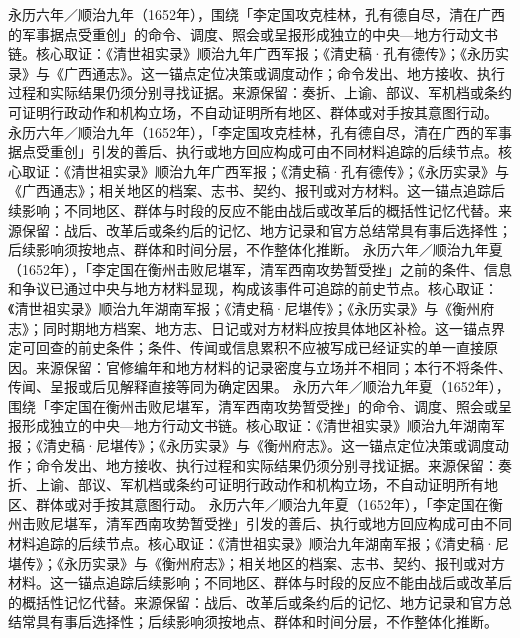 永历六年／顺治九年（1652年），围绕「李定国攻克桂林，孔有德自尽，清在广西的军事据点受重创」的命令、调度、照会或呈报形成独立的中央—地方行动文书链。核心取证：《清世祖实录》顺治九年广西军报；《清史稿·孔有德传》；《永历实录》与《广西通志》。这一锚点定位决策或调度动作；命令发出、地方接收、执行过程和实际结果仍须分别寻找证据。来源保留：奏折、上谕、部议、军机档或条约可证明行政动作和机构立场，不自动证明所有地区、群体或对手按其意图行动。
永历六年／顺治九年（1652年），「李定国攻克桂林，孔有德自尽，清在广西的军事据点受重创」引发的善后、执行或地方回应构成可由不同材料追踪的后续节点。核心取证：《清世祖实录》顺治九年广西军报；《清史稿·孔有德传》；《永历实录》与《广西通志》；相关地区的档案、志书、契约、报刊或对方材料。这一锚点追踪后续影响；不同地区、群体与时段的反应不能由战后或改革后的概括性记忆代替。来源保留：战后、改革后或条约后的记忆、地方记录和官方总结常具有事后选择性；后续影响须按地点、群体和时间分层，不作整体化推断。
永历六年／顺治九年夏（1652年），「李定国在衡州击败尼堪军，清军西南攻势暂受挫」之前的条件、信息和争议已通过中央与地方材料显现，构成该事件可追踪的前史节点。核心取证：《清世祖实录》顺治九年湖南军报；《清史稿·尼堪传》；《永历实录》与《衡州府志》；同时期地方档案、地方志、日记或对方材料应按具体地区补检。这一锚点界定可回查的前史条件；条件、传闻或信息累积不应被写成已经证实的单一直接原因。来源保留：官修编年和地方材料的记录密度与立场并不相同；本行不将条件、传闻、呈报或后见解释直接等同为确定因果。
永历六年／顺治九年夏（1652年），围绕「李定国在衡州击败尼堪军，清军西南攻势暂受挫」的命令、调度、照会或呈报形成独立的中央—地方行动文书链。核心取证：《清世祖实录》顺治九年湖南军报；《清史稿·尼堪传》；《永历实录》与《衡州府志》。这一锚点定位决策或调度动作；命令发出、地方接收、执行过程和实际结果仍须分别寻找证据。来源保留：奏折、上谕、部议、军机档或条约可证明行政动作和机构立场，不自动证明所有地区、群体或对手按其意图行动。
永历六年／顺治九年夏（1652年），「李定国在衡州击败尼堪军，清军西南攻势暂受挫」引发的善后、执行或地方回应构成可由不同材料追踪的后续节点。核心取证：《清世祖实录》顺治九年湖南军报；《清史稿·尼堪传》；《永历实录》与《衡州府志》；相关地区的档案、志书、契约、报刊或对方材料。这一锚点追踪后续影响；不同地区、群体与时段的反应不能由战后或改革后的概括性记忆代替。来源保留：战后、改革后或条约后的记忆、地方记录和官方总结常具有事后选择性；后续影响须按地点、群体和时间分层，不作整体化推断。
